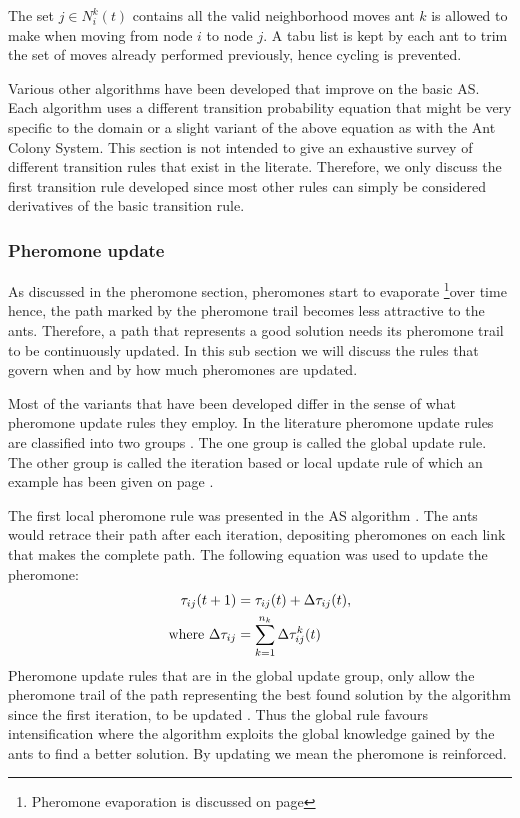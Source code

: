 The set $j \in N^k_i(t)$ contains all the valid neighborhood moves ant $k$ is allowed to make when moving from node $i$ to node $j$. A tabu list is kept by each ant to trim the set of moves already performed previously, hence cycling is prevented.

Various other algorithms have been developed that improve on the basic AS. Each algorithm uses a different transition probability equation that might be very specific to the domain or a slight variant of the above equation as with the Ant Colony System. This section is not intended to give an exhaustive survey of different transition rules that exist in the literate. Therefore, we only discuss the first transition rule developed since most other rules can simply be considered derivatives of the basic transition rule.
\subsubsection{Pheromone update}
As discussed in the pheromone section, pheromones start to evaporate \footnote{Pheromone evaporation is discussed on page \pageref{sec:pheromoneevapuation}}over time hence, the path marked by the pheromone trail becomes less attractive to the ants. Therefore, a path that represents a good solution needs its pheromone trail to be continuously updated. In this sub section we will discuss the rules that govern when and by how much pheromones are updated.

 Most of the variants that have been developed differ in the sense of what pheromone update rules they employ. In the literature pheromone update rules are classified into two groups \cite{CompuIntelligenceIntro}. The one group is called the global update rule. The other group is called the iteration based or local update rule of which an example has been given on page \pageref{def:localpheromoneupdate} \cite{CompuIntelligenceIntro}. 

The first local pheromone rule was presented in the AS algorithm \cite{CompuIntelligenceIntro}. The ants would retrace their path after each iteration, depositing pheromones on each link that makes the complete path. The following equation was used to update the pheromone:
\begin{align}
 \tau_{ij}(t+1) &= \tau_{ij}(t) + \Delta\tau_{ij}(t),\\ 
 \text{where }\Delta\tau_{ij} &= \sum^{n_k}_{k=1}\Delta\tau^k_{ij}(t) \notag
\end{align}
Pheromone update rules that are in the global update group, only allow the pheromone trail of the path representing the best found solution by the algorithm since the first iteration, to be updated \cite{CompuIntelligenceIntro}. Thus the global rule favours intensification where the algorithm exploits the global knowledge gained by the ants to find a better solution. By updating we mean the pheromone is reinforced. 

